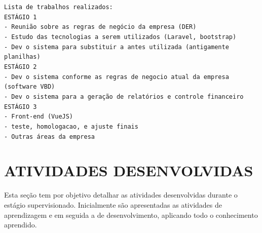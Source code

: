 \documentclass[
  12pt,				%
  openany,
  oneside,
  a4paper,			%
  english,			%
  brazil
]{article}
\numberwithin{figure}{section}
\numberwithin{table}{section}
\begin{document}
%
%
%
%
%
%



\noindent \texttt{Lista de trabalhos realizados:\\
  ESTÁGIO 1 \\
  - Reunião sobre as regras de negócio da empresa (DER) \\
  - Estudo das tecnologias a serem utilizados (Laravel, bootstrap) \\
  - Dev o sistema para substituir a antes utilizada (antigamente planilhas) \\
  ESTÁGIO 2 \\
  - Dev o sistema conforme as regras de negocio atual da empresa (software VBD) \\
  - Dev o sistema para a geração de relatórios e controle financeiro \\
  ESTÁGIO 3 \\
  - Front-end (VueJS) \\
  - teste, homologacao, e ajuste finais \\
  - Outras áreas da empresa
}

\clearpage



\section{ATIVIDADES DESENVOLVIDAS}


Esta seção tem por objetivo detalhar as atividades desenvolvidas durante o estágio supervisionado. Inicialmente são apresentadas as atividades de aprendizagem e em seguida a de desenvolvimento, aplicando todo o conhecimento aprendido.
\end{document}
